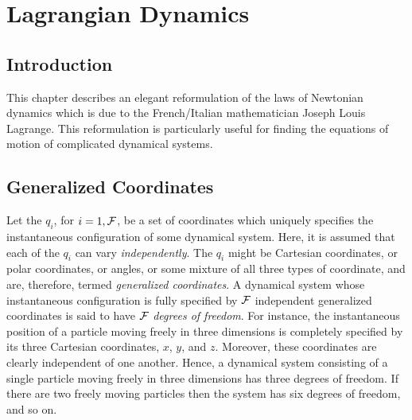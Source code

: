 \chapter{Lagrangian Dynamics}\label{s10}
\section{Introduction}
This chapter describes an elegant reformulation of the laws of
Newtonian dynamics which is due to  the French/Italian mathematician Joseph Louis
Lagrange. This reformulation is particularly useful for finding the
equations of motion of complicated dynamical systems.

\section{Generalized Coordinates}
Let the $q_i$, for $i=1,{\cal F}$, be a set of coordinates which uniquely
specifies the instantaneous configuration of some dynamical system.
Here, it is assumed that each of the $q_i$ can vary {\em independently}. 
The  $q_i$ might  be Cartesian coordinates, or polar 
coordinates, or angles, or some mixture of all three types of coordinate, and are, therefore,
termed {\em generalized coordinates}. A dynamical system whose
instantaneous configuration is fully specified by ${\cal F}$ independent
generalized coordinates is said to have ${\cal F}$ {\em degrees of freedom}. 
For instance, the instantaneous position of a particle moving freely
in three dimensions is completely specified by its three Cartesian
coordinates, $x$, $y$, and $z$. Moreover, these coordinates are clearly
independent of one another. 
Hence, a dynamical
system consisting of  a single particle moving
freely in three dimensions has three degrees of freedom. If there are two freely moving
particles then the system has six degrees of freedom, and so on.

